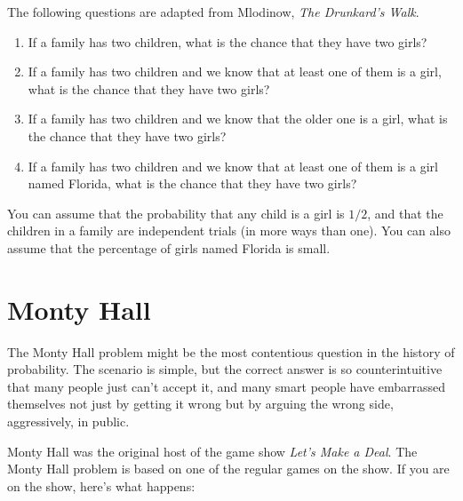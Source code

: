 \documentclass[12pt]{book}
\begin{document}
\begin{ex}

The following questions are adapted from Mlodinow, {\em The Drunkard's
  Walk}.

\begin{enumerate}

\item If a family has two children, what is the chance that they
  have two girls?

\item If a family has two children and we know that at least one of
  them is a girl, what is the chance that they have two girls?

\item If a family has two children and we know that the older one is a
  girl, what is the chance that they have two girls?

\item If a family has two children and we know that at least one of
  them is a girl named Florida, what is the chance that they have
  two girls?

\end{enumerate}

You can assume that the probability that any child is a girl is $1/2$,
and that the children in a family are independent trials (in more ways
than one).  You can also assume that the percentage of girls named
Florida is small.

\end{ex}


\section{Monty Hall}

The Monty Hall problem might be the most contentious question in
the history of probability.  The scenario is simple, but the correct
answer is so counterintuitive that many people just can't accept
it, and many smart people have embarrassed themselves not just by
getting it wrong but by arguing the wrong side, aggressively,
in public.

Monty Hall was the original host of the game show {\em Let's Make a
Deal}.  The Monty Hall problem is based on one of the regular
games on the show.  If you are on the show, here's what happens:
\end{document}
